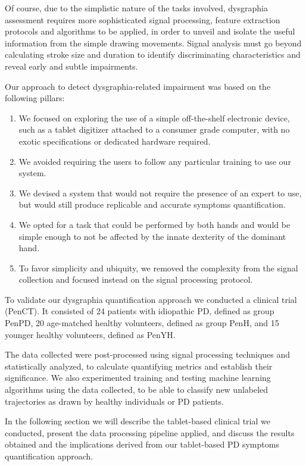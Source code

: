 Of course, due to the simplistic nature of the tasks involved, dysgraphia assessment requires more sophisticated signal processing, feature extraction protocols and algorithms to be applied, in order to unveil and isolate the useful information from the simple drawing movements. Signal analysis must go beyond calculating stroke size and duration to identify discriminating characteristics and reveal early and subtle impairments.

Our approach to detect dysgraphia-related impairment was based on the following pillars: 

\begin{enumerate}
\item We focused on exploring the use of a simple off-the-shelf electronic device, such as a tablet digitizer attached to a consumer grade computer, with no exotic specifications or dedicated hardware required.  
\item We avoided requiring the users to follow any particular training to use our system. 
\item We devised a system that would not require the presence of an expert to use, but would still produce replicable and accurate symptoms quantification. 
\item We opted for a task that could be performed by both hands and would be simple enough to not be affected by the innate dexterity of the dominant hand.
\item To favor simplicity and ubiquity, we removed the complexity from the signal collection and focused instead on the signal processing protocol.  
\end{enumerate}
\noindent
To validate our dysgraphia quantification approach we conducted a clinical trial (\gls{PenCT}). It consisted of 24 patients with idiopathic \gls{PD}, defined as group \gls{PenPD}, 20 age-matched healthy volunteers, defined as group \gls{PenH}, and 15 younger healthy volunteers, defined as \gls{PenYH}.

The data collected were post-processed using signal processing techniques and statistically analyzed, to calculate quantifying metrics and establish their significance. We also experimented training and testing machine learning algorithms using the data collected, to be able to classify new unlabeled trajectories as drawn by healthy individuals or \gls{PD} patients. 

In the following section we will describe the tablet-based clinical trial we conducted, present the data processing pipeline applied, and discuss the results obtained and the implications derived from our tablet-based \gls{PD} symptoms quantification approach. 

